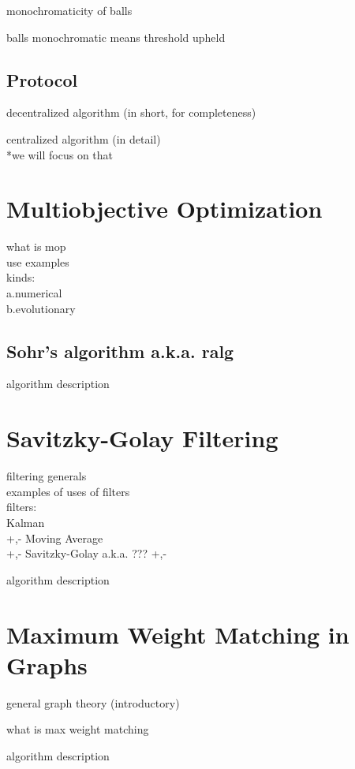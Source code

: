 monochromaticity of balls

balls monochromatic means threshold upheld


\subsection{Protocol} \label{subsec:theorBack-GM-protocol}

decentralized algorithm (in short, for completeness)

centralized algorithm (in detail)\\
*we will focus on that


\section{Multiobjective Optimization} \label{sec:theorBack-MOP}

what is mop\\
use examples\\
kinds:\\
	a.numerical\\
	b.evolutionary

\subsection{Sohr's algorithm a.k.a. ralg} \label{subsec:theorBack-MOP-minimax}

algorithm description

\section{Savitzky-Golay Filtering} \label{sec:theorBack-SavitzkyGolay}

filtering generals\\
examples of uses of filters\\
filters:\\
	Kalman\\
		+,-
	Moving Average\\
		+,-
	Savitzky-Golay a.k.a. ???
		+,-

algorithm description

\section{Maximum Weight Matching in Graphs} \label{sec:theorBack-MWMGraphs}

general graph theory (introductory)

what is max weight matching

algorithm description

